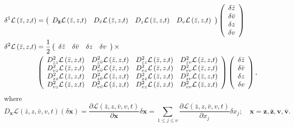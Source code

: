 \documentclass[aps,preprint]{revtex4}%
\begin{document}
\begin{align}
\delta^{1}\mathcal{L}\left(  \bar{z},z\mathbf{,}t\right)   &  =\left(
\begin{array}
[c]{cccc}%
D_{\mathbf{\bar{z}}}\mathcal{L}\left(  \bar{z},z\mathbf{,}t\right)  &
D_{\bar{v}}\mathcal{L}\left(  \bar{z},z\mathbf{,}t\right)  & D_{z}%
\mathcal{L}\left(  \bar{z},z\mathbf{,}t\right)  & D_{v}\mathcal{L}\left(
\bar{z},z\mathbf{,}t\right)
\end{array}
\right)  \left(
\begin{array}
[c]{c}%
\delta\bar{z}\\
\delta\bar{v}\\
\delta z\\
\delta v
\end{array}
\right) \\
\delta^{2}\mathcal{L}\left(  \bar{z},z\mathbf{,}t\right)   &  =\frac{1}%
{2}\left(
\begin{array}
[c]{cccc}%
\delta\bar{z} & \delta\bar{v} & \delta z & \delta v
\end{array}
\right)  \times\nonumber\\
&  \left(
\begin{array}
[c]{cccc}%
D_{zz}^{2}\mathcal{L}\left(  \bar{z},z\mathbf{,}t\right)  & D_{z\bar{v}}%
^{2}\mathcal{L}\left(  \bar{z},z\mathbf{,}t\right)  & D_{zz}^{2}%
\mathcal{L}\left(  \bar{z},z\mathbf{,}t\right)  & D_{zv}^{2}\mathcal{L}\left(
\bar{z},z\mathbf{,}t\right) \\
D_{vz}^{2}\mathcal{L}\left(  \bar{z},z\mathbf{,}t\right)  & D_{v\bar{v}}%
^{2}\mathcal{L}\left(  \bar{z},z\mathbf{,}t\right)  & D_{vz}^{2}%
\mathcal{L}\left(  \bar{z},z\mathbf{,}t\right)  & D_{vv}^{2}\mathcal{L}\left(
\bar{z},z\mathbf{,}t\right) \\
D_{zz}^{2}\mathcal{L}\left(  \bar{z},z\mathbf{,}t\right)  & D_{z\bar{v}}%
^{2}\mathcal{L}\left(  \bar{z},z\mathbf{,}t\right)  & D_{zz}^{2}%
\mathcal{L}\left(  \bar{z},z\mathbf{,}t\right)  & D_{zv}^{2}\mathcal{L}\left(
\bar{z},z\mathbf{,}t\right) \\
D_{vz}^{2}\mathcal{L}\left(  \bar{z},z\mathbf{,}t\right)  & D_{v\bar{v}}%
^{2}\mathcal{L}\left(  \bar{z},z\mathbf{,}t\right)  & D_{vz}^{2}%
\mathcal{L}\left(  \bar{z},z\mathbf{,}t\right)  & D_{vv}^{2}\mathcal{L}\left(
\bar{z},z\mathbf{,}t\right)
\end{array}
\right)  \left(
\begin{array}
[c]{c}%
\delta\bar{z}\\
\delta\bar{v}\\
\delta z\\
\delta v
\end{array}
\right)  ,
\end{align}
where
\begin{equation}
D_{\mathbf{x}}\mathcal{L}\left(  \bar{z},z\mathbf{,}\bar{v},v,t\right)
\left(  \delta\mathbf{x}\right)  =\frac{\partial\mathcal{L}\left(  \bar
{z},z\mathbf{,}\bar{v},v,t\right)  }{\partial\mathbf{x}}\delta\mathbf{x=}%
\sum_{1\leq j\leq\nu}\frac{\partial\mathcal{L}\left(  \bar{z},z\mathbf{,}%
\bar{v},v,t\right)  }{\partial x_{j}}\delta x_{j};\quad\mathbf{x=z,\bar
{z},v,\bar{v}.}%
\end{equation}
\end{document}
